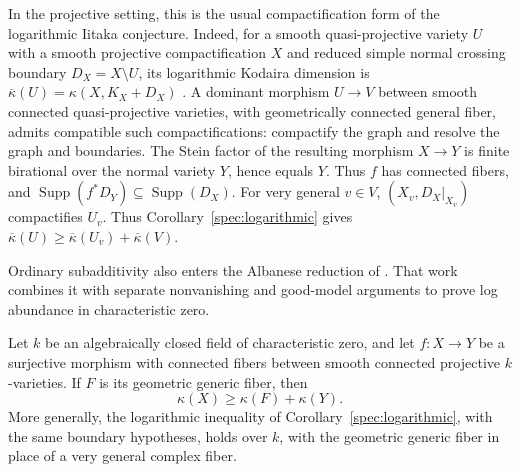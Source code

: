 In the projective setting, this is the usual compactification form of
the logarithmic Iitaka conjecture.  Indeed, for a smooth
quasi-projective variety $U$ with a smooth projective compactification
$X$ and reduced simple normal crossing boundary $D_X=X\setminus U$,
its logarithmic Kodaira dimension is
$\overline\kappa(U)=\kappa(X,K_X+D_X)$
\cite{IitakaLog}.  A dominant morphism $U\to V$ between smooth
connected quasi-projective varieties, with geometrically connected
general fiber, admits compatible such compactifications:
compactify the graph and resolve the graph and boundaries.  The
Stein factor of the resulting morphism $X\to Y$ is finite
birational over the normal variety $Y$, hence equals $Y$.
Thus $f$ has connected fibers, and
$\operatorname{Supp}(f^*D_Y)\subseteq\operatorname{Supp}(D_X)$.
For very general $v\in V$, $(X_v,D_X|_{X_v})$ compactifies $U_v$.
Thus Corollary~\ref{spec:logarithmic} gives
$\overline\kappa(U)\geq\overline\kappa(U_v)+\overline\kappa(V)$.

Ordinary subadditivity also enters the Albanese reduction of
\cite{OpenAILogAbundance2026}. That work combines
it with separate nonvanishing and good-model arguments to prove log
abundance in characteristic zero.

\begin{corollary}
\label{spec:ordinary}
Let $k$ be an algebraically closed field of characteristic zero, and
let $f:X\to Y$ be a surjective morphism with connected fibers between
smooth connected projective $k$-varieties.  If $F$ is its geometric
generic fiber, then
\begin{equation}\label{spec:ordinary-inequality}
 \kappa(X)\geq\kappa(F)+\kappa(Y).
\end{equation}
More generally, the logarithmic inequality of
Corollary~\ref{spec:logarithmic}, with the same boundary hypotheses,
holds over $k$, with the geometric generic fiber in place of a very
general complex fiber.
\end{corollary}

